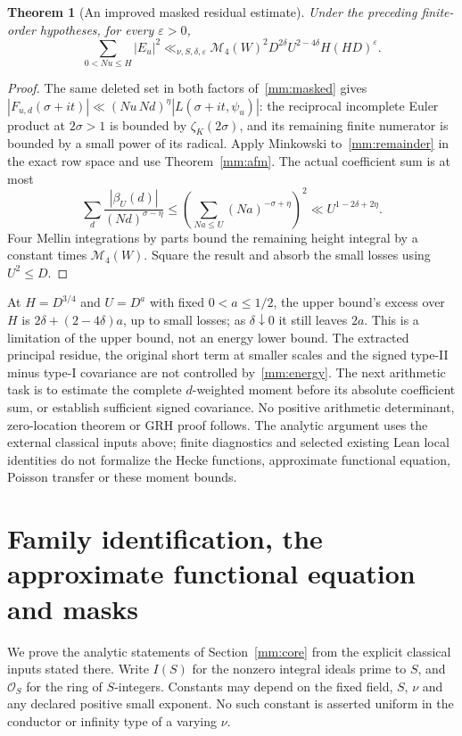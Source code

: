 \documentclass[11pt]{article}
\newtheorem{theorem}{Theorem}[section]
\theoremstyle{definition}\newtheorem{definition}[theorem]{Definition}
\theoremstyle{remark}\newtheorem{remark}[theorem]{Remark}
\begin{document}
\begin{theorem}[An improved masked residual estimate]
\label{mm:residual}
Under the preceding finite-order hypotheses, for every $\varepsilon>0$,
\begin{equation}\label{mm:energy}
 \sum_{0<Nu\le H}|E_u|^2
 \ll_{\nu,S,\delta,\varepsilon}
 \mathcal M_4(W)^2D^{2\delta}U^{2-4\delta}H(HD)^\varepsilon.
\end{equation}
\end{theorem}
\begin{proof}
The same deleted set in both factors of~\eqref{mm:masked} gives
$|F_{u,d}(\sigma+it)|\ll (Nu\,Nd)^\eta|L(\sigma+it,\psi_u)|$:
the reciprocal incomplete Euler product at $2\sigma>1$ is bounded
by $\zeta_K(2\sigma)$, and its remaining finite numerator is bounded
by a small power of its radical. Apply Minkowski to~\eqref{mm:remainder}
in the exact row space and use Theorem~\ref{mm:afm}. The actual coefficient
sum is at most
\[
 \sum_d\frac{|\beta_U(d)|}{(Nd)^{\sigma-\eta}}
 \le\left(\sum_{Na\le U}(Na)^{-\sigma+\eta}\right)^2
 \ll U^{1-2\delta+2\eta}.
\]
Four Mellin integrations by parts bound the remaining height integral
by a constant times $\mathcal M_4(W)$. Square the result and absorb
the small losses using $U^2\le D$.
\end{proof}

At $H=D^{3/4}$ and $U=D^a$ with fixed $0<a\le1/2$, the upper bound's excess
over $H$ is $2\delta+(2-4\delta)a$, up to small losses; as
$\delta\downarrow0$ it still leaves $2a$. This is a limitation of the
upper bound, not an energy lower bound. The extracted principal residue,
the original short term at smaller scales and the signed type-II minus
type-I covariance are not controlled by~\eqref{mm:energy}. The next
arithmetic task is to estimate the complete $d$-weighted moment before
its absolute coefficient sum, or establish sufficient signed covariance.
No positive arithmetic determinant, zero-location theorem or GRH proof
follows. The analytic argument uses the external classical inputs above;
finite diagnostics and selected existing Lean local identities do not
formalize the Hecke functions, approximate functional equation, Poisson
transfer or these moment bounds.

\section{Family identification, the approximate functional equation and masks}
\label{mm:details}
We prove the analytic statements of Section~\ref{mm:core} from the
explicit classical inputs stated there. Write $I(S)$ for the nonzero
integral ideals prime to $S$, and $\mathcal O_S$ for the ring of
$S$-integers. Constants may depend on the fixed field, $S$, $\nu$ and
any declared positive small exponent. No such constant is asserted
uniform in the conductor or infinity type of a varying $\nu$.
\end{document}

